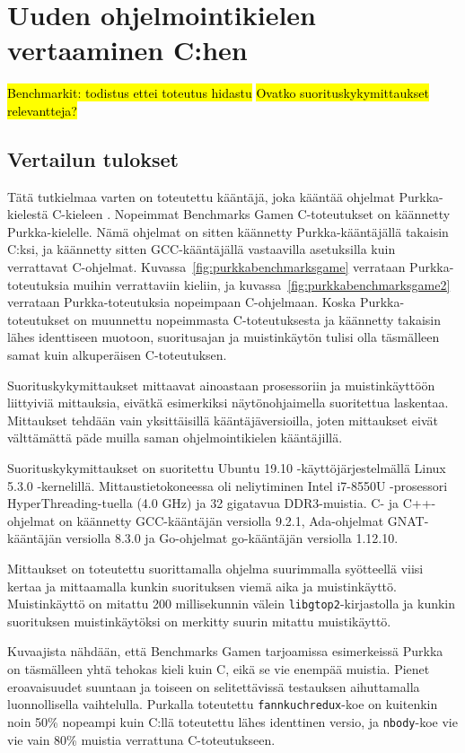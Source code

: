 \section{Uuden ohjelmointikielen vertaaminen C:hen}

\hl{Benchmarkit: todistus ettei toteutus hidastu}
\hl{Ovatko suorituskykymittaukset relevantteja?}

\subsection{Vertailun tulokset}
\label{sec:results}

Tätä tutkielmaa varten on toteutettu kääntäjä, joka kääntää ohjelmat
Purkka-kielestä C-kieleen \citep{purkka}. Nopeimmat Benchmarks Gamen
C-toteutukset on käännetty Purkka-kielelle. Nämä ohjelmat on sitten käännetty
Purkka-kääntäjällä takaisin C:ksi, ja käännetty sitten GCC-kääntäjällä
vastaavilla asetuksilla kuin verrattavat C-ohjelmat.
Kuvassa~\ref{fig:purkkabenchmarksgame} verrataan Purkka-toteutuksia muihin
verrattaviin kieliin, ja kuvassa~\ref{fig:purkkabenchmarksgame2} verrataan
Purkka-toteutuksia nopeimpaan C-ohjelmaan. Koska Purkka-toteutukset on
muunnettu nopeimmasta C-toteutuksesta ja käännetty takaisin lähes identtiseen
muotoon, suoritusajan ja muistinkäytön tulisi olla täsmälleen samat kuin
alkuperäisen C-toteutuksen.

Suorituskykymittaukset mittaavat ainoastaan prosessoriin ja muistinkäyttöön
liittyiviä mittauksia, eivätkä esimerkiksi näytönohjaimella suoritettua
laskentaa. Mittaukset tehdään vain yksittäisillä kääntäjäversioilla, joten
mittaukset eivät välttämättä päde muilla saman ohjelmointikielen kääntäjillä.

Suorituskykymittaukset on suoritettu Ubuntu 19.10 -käyttöjärjestelmällä Linux
5.3.0 -kernelillä. Mittaustietokoneessa oli neliytiminen Intel i7-8550U
-prosessori Hy\-per\-Thread\-ing-tuella (4.0 GHz) ja 32 gigatavua DDR3-muistia.
C- ja C++-ohjelmat on käännetty GCC-kääntäjän versiolla 9.2.1, Ada-ohjelmat
GNAT-kääntäjän versiolla 8.3.0 ja Go-ohjelmat go-kääntäjän versiolla 1.12.10.

Mittaukset on toteutettu suorittamalla ohjelma suurimmalla syötteellä viisi
kertaa ja mittaamalla kunkin suorituksen viemä aika ja muistinkäyttö.
Muistinkäyttö on mitattu 200 millisekunnin välein \texttt{libgtop2}-kirjastolla
ja kunkin suorituksen muistinkäytöksi on merkitty suurin mitattu muistikäyttö.

Kuvaajista nähdään, että Benchmarks Gamen tarjoamissa esimerkeissä Purkka on
täsmälleen yhtä tehokas kieli kuin C, eikä se vie enempää muistia. Pienet
eroavaisuudet suuntaan ja toiseen on selitettävissä testauksen aihuttamalla
luonnollisella vaihtelulla. Purkalla toteutettu \texttt{fannkuchredux}-koe on
kuitenkin noin 50\% nopeampi kuin C:llä toteutettu lähes identtinen versio, ja
\texttt{nbody}-koe vie vie vain 80\% muistia verrattuna C-toteutukseen.

